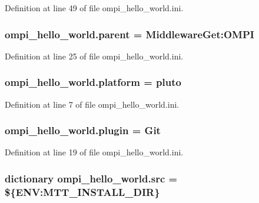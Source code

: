 Definition at line 49 of file ompi\-\_\-hello\-\_\-world.\-ini.

\hypertarget{namespaceompi__hello__world_a5508612e06f3402554fdda7a9eca7d62}{
\subsubsection[{parent}]{\setlength{\rightskip}{0pt plus 5cm}ompi\-\_\-hello\-\_\-world.\-parent = Middleware\-Get\-:\-O\-M\-P\-I}}\label{namespaceompi__hello__world_a5508612e06f3402554fdda7a9eca7d62}


Definition at line 25 of file ompi\-\_\-hello\-\_\-world.\-ini.

\hypertarget{namespaceompi__hello__world_af8ab2503d0ec334a65a72e930a24e713}{
\subsubsection[{platform}]{\setlength{\rightskip}{0pt plus 5cm}ompi\-\_\-hello\-\_\-world.\-platform = pluto}}\label{namespaceompi__hello__world_af8ab2503d0ec334a65a72e930a24e713}


Definition at line 7 of file ompi\-\_\-hello\-\_\-world.\-ini.

\hypertarget{namespaceompi__hello__world_a687eab84563b30840a200bfaf5407f51}{
\subsubsection[{plugin}]{\setlength{\rightskip}{0pt plus 5cm}ompi\-\_\-hello\-\_\-world.\-plugin = Git}}\label{namespaceompi__hello__world_a687eab84563b30840a200bfaf5407f51}


Definition at line 19 of file ompi\-\_\-hello\-\_\-world.\-ini.

\hypertarget{namespaceompi__hello__world_a88a2db81a1836d83ed41abd7d39c9c4e}{
\subsubsection[{src}]{\setlength{\rightskip}{0pt plus 5cm}dictionary ompi\-\_\-hello\-\_\-world.\-src = \$\{E\-N\-V\-:\-M\-T\-T\-\_\-\-I\-N\-S\-T\-A\-L\-L\-\_\-\-D\-I\-R\}}}\label{namespaceompi__hello__world_a88a2db81a1836d83ed41abd7d39c9c4e}



